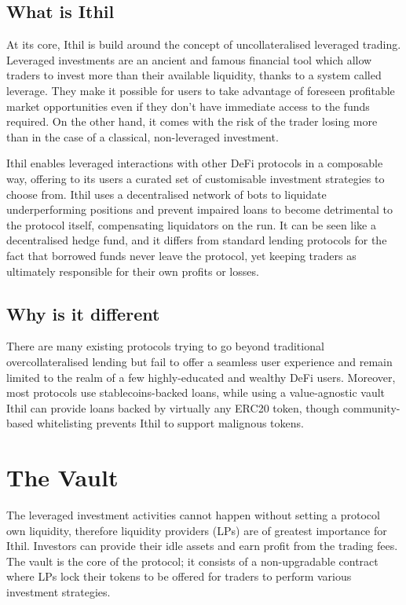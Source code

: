 \documentclass[a4paper,10 pt]{article}
\theoremstyle{definition}
\begin{document}
\subsection{What is Ithil}

At its core, Ithil is build around the concept of uncollateralised leveraged trading.
Leveraged investments are an ancient and famous financial tool which allow traders to invest more than their available liquidity, thanks to a system called leverage. They make it possible for users to take advantage of foreseen profitable market opportunities even if they don't have immediate access to the funds required. On the other hand, it comes with the risk of the trader losing more than in the case of a classical, non-leveraged investment.

Ithil enables leveraged interactions with other DeFi protocols in a composable way, offering to its users a curated set of customisable investment strategies to choose from. Ithil uses a decentralised network of bots to liquidate underperforming positions and prevent impaired loans to become detrimental to the protocol itself, compensating liquidators on the run.
It can be seen like a decentralised hedge fund, and it differs from standard lending protocols for the fact that borrowed funds never leave the protocol, yet keeping traders as ultimately responsible for their own profits or losses.

\subsection{Why is it different}
There are many existing protocols trying to go beyond traditional overcollateralised lending but fail to offer a seamless user experience and remain limited to the realm of a few highly-educated and wealthy DeFi users. Moreover, most protocols use stablecoins-backed loans, while using a value-agnostic vault Ithil can provide loans backed by virtually any ERC20 token, though community-based whitelisting prevents Ithil to support malignous tokens.

\section{The Vault}
The leveraged investment activities cannot happen without setting a protocol own liquidity, therefore liquidity providers (LPs) are of greatest importance for Ithil. Investors can provide their idle assets and earn profit from the trading fees.
The vault is the core of the protocol; it consists of a non-upgradable contract where LPs lock their tokens to be offered for traders to perform various investment strategies.
\end{document}

